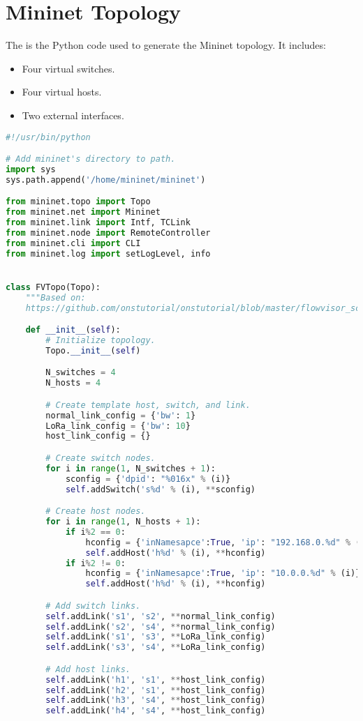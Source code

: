 \chapter{Mininet Topology} \label{annex:mininet}
The is the Python code used to generate the Mininet topology. It includes:
\begin{itemize}
    \item Four virtual switches.
    \item Four virtual hosts.
    \item Two external interfaces.
\end{itemize}

\begin{lstlisting}[language=Python]
#!/usr/bin/python

# Add mininet's directory to path.
import sys
sys.path.append('/home/mininet/mininet')

from mininet.topo import Topo
from mininet.net import Mininet
from mininet.link import Intf, TCLink
from mininet.node import RemoteController
from mininet.cli import CLI
from mininet.log import setLogLevel, info


class FVTopo(Topo):
	"""Based on:
	https://github.com/onstutorial/onstutorial/blob/master/flowvisor_scripts/flowvisor_topo.py"""

	def __init__(self):
		# Initialize topology.
		Topo.__init__(self)

		N_switches = 4
		N_hosts = 4

		# Create template host, switch, and link.
		normal_link_config = {'bw': 1}
		LoRa_link_config = {'bw': 10}
		host_link_config = {}

		# Create switch nodes.
		for i in range(1, N_switches + 1):
			sconfig = {'dpid': "%016x" % (i)}
			self.addSwitch('s%d' % (i), **sconfig)

		# Create host nodes.
		for i in range(1, N_hosts + 1):
			if i%2 == 0:
				hconfig = {'inNamesapce':True, 'ip': "192.168.0.%d" % (i)}
				self.addHost('h%d' % (i), **hconfig)
			if i%2 != 0:
				hconfig = {'inNamesapce':True, 'ip': "10.0.0.%d" % (i)}
				self.addHost('h%d' % (i), **hconfig)

		# Add switch links.
		self.addLink('s1', 's2', **normal_link_config)
		self.addLink('s2', 's4', **normal_link_config)
		self.addLink('s1', 's3', **LoRa_link_config)
		self.addLink('s3', 's4', **LoRa_link_config)

		# Add host links.
		self.addLink('h1', 's1', **host_link_config)
		self.addLink('h2', 's1', **host_link_config)
		self.addLink('h3', 's4', **host_link_config)
		self.addLink('h4', 's4', **host_link_config)



\end{lstlisting}
